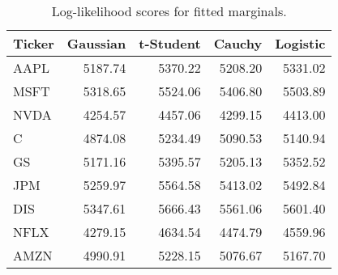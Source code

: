 \begin{table}[H]

\caption{Log-likelihood scores for fitted marginals.}
\centering
\fontsize{11}{13}\selectfont
\begin{tabular}[t]{lrrrr}
\toprule
Ticker & Gaussian & t-Student & Cauchy & Logistic\\
\midrule
AAPL & 5187.74 & 5370.22 & 5208.20 & 5331.02\\
MSFT & 5318.65 & 5524.06 & 5406.80 & 5503.89\\
NVDA & 4254.57 & 4457.06 & 4299.15 & 4413.00\\
C & 4874.08 & 5234.49 & 5090.53 & 5140.94\\
GS & 5171.16 & 5395.57 & 5205.13 & 5352.52\\
JPM & 5259.97 & 5564.58 & 5413.02 & 5492.84\\
DIS & 5347.61 & 5666.43 & 5561.06 & 5601.40\\
NFLX & 4279.15 & 4634.54 & 4474.79 & 4559.96\\
AMZN & 4990.91 & 5228.15 & 5076.67 & 5167.70\\
\bottomrule
\end{tabular}
\end{table}
